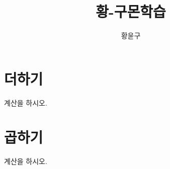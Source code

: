 \documentclass[17pt, twoside, openright]{memoir}
\author{황윤구}
\title{황-구몬학습}
\begin{document}
\maketitle
\chapter{더하기}
계산을 하시오.
\begin{multicols}{2}
    \begin{enumerate}[label=\scriptsize{(\arabic*)}]
        
    \end{enumerate}    
\end{multicols}

\chapter{곱하기}
계산을 하시오.
\begin{multicols}{2}
    \begin{enumerate}[label=\scriptsize{(\arabic*)}]
        
    \end{enumerate}    
\end{multicols}
\end{document}
